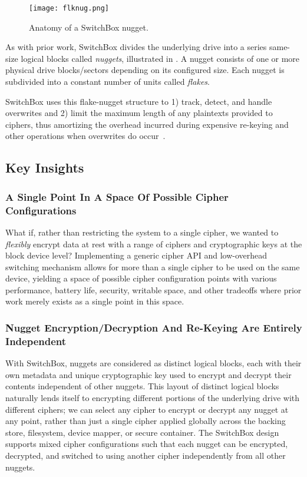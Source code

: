 \begin{figure}[ht]
   \centering
   \texttt{[image: flknug.png]}
   \caption{Anatomy of a SwitchBox nugget.}\label{fig:flknug}
\end{figure}

As with prior work, SwitchBox divides the underlying drive into a series
same-size logical blocks called \emph{nuggets}, illustrated in .
A nugget consists of one or more physical drive blocks/sectors depending on its
configured size. Each nugget is subdivided into a constant number of units
called \emph{flakes}.

SwitchBox uses this flake-nugget structure to 1) track, detect, and handle
overwrites and 2) limit the maximum length of any plaintexts provided to
ciphers, thus amortizing the overhead incurred during expensive re-keying and
other operations when overwrites do occur~\cite{StrongBox}.

\subsection{Key Insights}

\subsubsection{A Single Point In A Space Of Possible Cipher Configurations}

What if, rather than restricting the system to a single cipher, we wanted to
\textit{flexibly} encrypt data at rest with a range of ciphers and cryptographic
keys at the block device level? Implementing a generic cipher API and
low-overhead switching mechanism allows for more than a single cipher to be used
on the same device, yielding a space of possible cipher configuration points
with various performance, battery life, security, writable space, and other
tradeoffs where prior work merely exists as a single point in this space.

\subsubsection{Nugget Encryption/Decryption And Re-Keying Are Entirely Independent}

With SwitchBox, nuggets are considered as distinct logical blocks, each with
their own metadata and unique cryptographic key used to encrypt and decrypt
their contents independent of other nuggets. This layout of distinct logical
blocks naturally lends itself to encrypting different portions of the underlying
drive with different ciphers; we can select any cipher to encrypt or decrypt any
nugget at any point, rather than just a single cipher applied globally across
the backing store, filesystem, device mapper, or secure container. The SwitchBox
design supports mixed cipher configurations such that each nugget can be
encrypted, decrypted, and switched to using another cipher independently from
all other nuggets.

